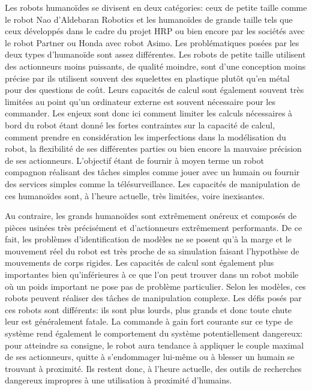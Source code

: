 Les robots humanoïdes se divisent en deux catégories: ceux de petite
taille comme le robot Nao d'Aldebaran Robotics \citep{wikipedia.nao}
et les humanoïdes de grande taille tels que ceux développés dans le
cadre du projet HRP ou bien encore par les sociétés avec le robot
Partner ou Honda avec robot Asimo. Les problématiques posées par les
deux types d'humanoïde sont assez différentes. Les robots de petite
taille utilisent des actionneurs moins puissants, de qualité moindre,
sont d'une conception moins précise par ils utilisent souvent des
squelettes en plastique plutôt qu'en métal pour des questions de
coût. Leurs capacités de calcul sont également souvent très limitées
au point qu'un ordinateur externe est souvent nécessaire pour les
commander. Les enjeux sont donc ici comment limiter les calculs
nécessaires à bord du robot étant donné les fortes contraintes sur la
capacité de calcul, comment prendre en considération les imperfections
dans la modélisation du robot, la flexibilité de ses différentes
parties ou bien encore la mauvaise précision de ses
actionneurs. L'objectif étant de fournir à moyen terme un robot
compagnon réalisant des tâches simples comme jouer avec un humain ou
fournir des services simples comme la télésurveillance. Les capacités
de manipulation de ces humanoïdes sont, à l'heure actuelle, très
limitées, voire inexisantes.


Au contraire, les grands humanoïdes sont extrêmement onéreux et
composés de pièces usinées très précisément et d'actionneurs
extrêmement performants. De ce fait, les problèmes d'identification de
modèles ne se posent qu'à la marge et le mouvement réel du robot est
très proche de sa simulation faisant l'hypothèse de mouvements de
corps rigides. Les capacités de calcul sont également plus importantes
bien qu'inférieures à ce que l'on peut trouver dans un robot mobile où
un poids important ne pose pas de problème particulier. Selon les
modèles, ces robots peuvent réaliser des tâches de manipulation
complexe. Les défis posés par ces robots sont différents: ils sont
plus lourds, plus grands et donc toute chute leur est généralement
fatale. La commande à gain fort courante sur ce type de système rend
également le comportement du système potentiellement dangereux: pour
atteindre sa consigne, le robot aura tendance à appliquer le couple
maximal de ses actionneurs, quitte à s'endommager lui-même ou à
blesser un humain se trouvant à proximité. Ils restent donc, à l'heure
actuelle, des outils de recherches dangereux impropres à une
utilisation à proximité d'humains.


